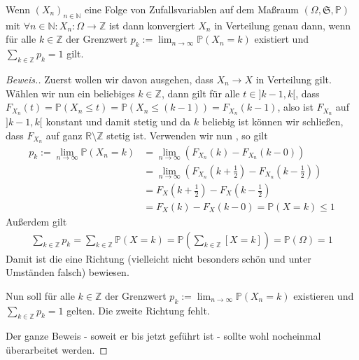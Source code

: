 \begin{lemma}
    Wenn $(X_n)_{n\in\mathbb{N}}$ eine Folge von Zufallsvariablen auf dem Maßraum $(\Omega,\mathfrak{S},\mathbb{P})$ mit $\forall n\in\mathbb{N}:X_n:\Omega\to\mathbb{Z}$ ist dann konvergiert $X_n$ in Verteilung genau dann, wenn für alle $k\in\mathbb{Z}$ der Grenzwert $p_k:=\lim_{n\to\infty}\mathbb{P}(X_n=k)$ existiert und $\sum_{k\in\mathbb{Z}}p_k=1$ gilt.
\end{lemma}
\begin{proof}[Beweis.]
    Zuerst wollen wir davon ausgehen, dass $X_n\to X$ in Verteilung gilt. Wählen wir nun ein beliebiges $k\in\mathbb{Z}$, dann gilt für alle $t\in]k-1,k[$, dass $F_{X_n}(t)=\mathbb{P}(X_n\leq t)=\mathbb{P}(X_n\leq(k-1))=F_{X_n}(k-1)$, also ist $F_{X_n}$ auf $]k-1,k[$ konstant und damit stetig und da $k$ beliebig ist können wir schließen, dass $F_{X_n}$ auf ganz $\mathbb{R}\setminus\mathbb{Z}$ stetig ist. Verwenden wir nun \cite[Satz 12.5]{GrillSkript}, so gilt
    \begin{align*}
        p_k:=\lim_{n\to\infty}\mathbb{P}(X_n=k)&=\lim_{n\to\infty}\left(F_{X_n}(k)-F_{X_n}(k-0)\right)\\
        &=\lim_{n\to\infty}\left(F_{X_n}\left(k+\frac{1}{2}\right)-F_{X_n}\left(k-\frac{1}{2}\right)\right)\\
        &=F_{X}\left(k+\frac{1}{2}\right)-F_{X}\left(k-\frac{1}{2}\right)\\
        &=F_{X}(k)-F_{X}(k-0)=\mathbb{P}(X=k)\leq 1
    \end{align*}
    Außerdem gilt
    \begin{align*}
        \sum_{k\in\mathbb{Z}}p_k=\sum_{k\in\mathbb{Z}}\mathbb{P}(X=k)=\mathbb{P}\left(\sum_{k\in\mathbb{Z}}[X=k]\right)=\mathbb{P}(\Omega)=1
    \end{align*}
    Damit ist die eine Richtung (vielleicht nicht besonders schön und unter Umständen falsch) bewiesen.

    Nun soll für alle $k\in\mathbb{Z}$ der Grenzwert $p_k:=\lim_{n\to\infty}\mathbb{P}(X_n=k)$ existieren und $\sum_{k\in\mathbb{Z}}p_k=1$ gelten. Die zweite Richtung fehlt.

    Der ganze Beweis - soweit er bis jetzt geführt ist - sollte wohl nocheinmal überarbeitet werden.
\end{proof}
